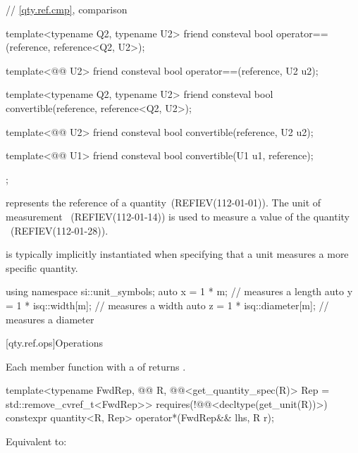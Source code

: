 \begin{codeblock}
{{  // \ref{qty.ref.cmp}, comparison

  template<typename Q2, typename U2>
  friend consteval bool operator==(reference, reference<Q2, U2>);

  template<@@ U2>
  friend consteval bool operator==(reference, U2 u2);

  template<typename Q2, typename U2>
  friend consteval bool convertible(reference, reference<Q2, U2>);

  template<@@ U2>
  friend consteval bool convertible(reference, U2 u2);

  template<@@ U1>
  friend consteval bool convertible(U1 u1, reference);
};

}
\end{codeblock}

\pnum
{} represents the reference of a quantity~(REFIEV(112-01-01)).
The unit of measurement ~(REFIEV(112-01-14))
is used to measure a value of the quantity ~(REFIEV(112-01-28)).
\begin{note}
 is typically implicitly instantiated
when specifying that a unit measures a more specific quantity.
\begin{example}
\begin{codeblock}
using namespace si::unit_symbols;
auto x = 1 * m;                 // measures a length
auto y = 1 * isq::width[m];     // measures a width
auto z = 1 * isq::diameter[m];  // measures a diameter
\end{codeblock}
\end{example}
\end{note}

[qty.ref.ops]{Operations}

\pnum
Each member function with a 
of 
returns \tcode{\{\}}.

\begin{itemdecl}
template<typename FwdRep, @@ R,
         @@<get_quantity_spec(R{})> Rep = std::remove_cvref_t<FwdRep>>
  requires(!@@<decltype(get_unit(R{}))>)
constexpr quantity<R{}, Rep> operator*(FwdRep&& lhs, R r);
\end{itemdecl}

\begin{itemdescr}
\pnum
\effects
Equivalent to:
\end{itemdescr}

